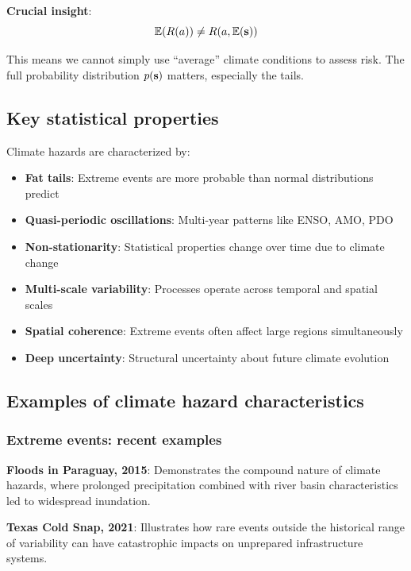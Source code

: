 \documentclass[
  letterpaper,
  DIV=11,
  numbers=noendperiod]{scrreprt}
\providecommand{\tightlist}{%
  \setlength{\itemsep}{0pt}\setlength{\parskip}{0pt}}
\begin{document}
\textbf{Crucial insight}: \[
\mathbb{E}(R(a)) \neq R(a, \mathbb{E}({\bf{s}}))
\]

This means we cannot simply use ``average'' climate conditions to assess
risk. The full probability distribution \(p({\bf{s}})\) matters,
especially the tails.

\subsection{Key statistical
properties}\label{key-statistical-properties}

Climate hazards are characterized by:

\begin{itemize}
\tightlist
\item
  \textbf{Fat tails}: Extreme events are more probable than normal
  distributions predict
\item
  \textbf{Quasi-periodic oscillations}: Multi-year patterns like ENSO,
  AMO, PDO
\item
  \textbf{Non-stationarity}: Statistical properties change over time due
  to climate change
\item
  \textbf{Multi-scale variability}: Processes operate across temporal
  and spatial scales
\item
  \textbf{Spatial coherence}: Extreme events often affect large regions
  simultaneously
\item
  \textbf{Deep uncertainty}: Structural uncertainty about future climate
  evolution
\end{itemize}

\subsection{Examples of climate hazard
characteristics}\label{examples-of-climate-hazard-characteristics}

\subsubsection{Extreme events: recent
examples}\label{extreme-events-recent-examples}

\textbf{Floods in Paraguay, 2015}: Demonstrates the compound nature of
climate hazards, where prolonged precipitation combined with river basin
characteristics led to widespread inundation.

\textbf{Texas Cold Snap, 2021}: Illustrates how rare events outside the
historical range of variability can have catastrophic impacts on
unprepared infrastructure systems.
\end{document}
